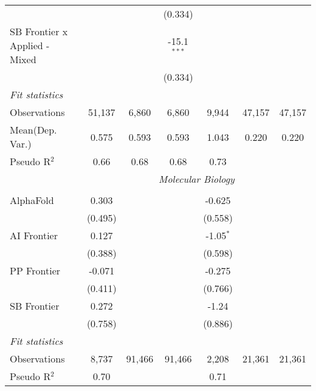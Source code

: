\begin{tabular}{lcccccc}
                                 &              &               & (0.334)       &             &        &   \\   
   SB Frontier x Applied - Mixed &              &               & -15.1$^{***}$ &             &        &   \\   
                                 &              &               & (0.334)       &             &        &   \\   
   \midrule
   \emph{Fit statistics}\\
   Observations                  & 51,137       & 6,860         & 6,860         & 9,944       & 47,157 & 47,157\\  
Mean(Dep. Var.) & 0.575 & 0.593 & 0.593 & 1.043 & 0.220 & 0.220 \\
   Pseudo R$^2$                  & 0.66         & 0.68          & 0.68          & 0.73        &        & \\  
   
 & \multicolumn{6}{c}{\textit{Molecular Biology}} \\ \\
   AlphaFold    & 0.303    &        &        & -0.625      &        &   \\   
                & (0.495)  &        &        & (0.558)     &        &   \\   
   AI Frontier  & 0.127    &        &        & -1.05$^{*}$ &        &   \\   
                & (0.388)  &        &        & (0.598)     &        &   \\   
   PP Frontier  & -0.071   &        &        & -0.275      &        &   \\   
                & (0.411)  &        &        & (0.766)     &        &   \\   
   SB Frontier  & 0.272    &        &        & -1.24       &        &   \\   
                & (0.758)  &        &        & (0.886)     &        &   \\   
   \midrule
   \emph{Fit statistics}\\
   Observations & 8,737    & 91,466 & 91,466 & 2,208       & 21,361 & 21,361\\  
   Pseudo R$^2$ & 0.70     &        &        & 0.71        &        & \\  
   

\end{tabular}
